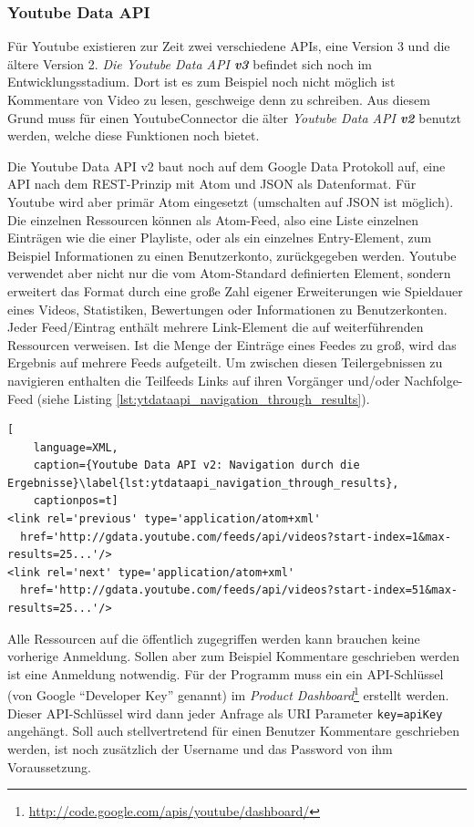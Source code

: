 \subsubsection{Youtube Data API} %
\label{ssub:youtube_data_api}

Für Youtube existieren zur Zeit zwei verschiedene APIs, eine Version 3 und die ältere Version 2. \emph{Die Youtube Data API \textbf{v3}} befindet sich noch im Entwicklungsstadium. Dort ist es zum Beispiel noch nicht möglich ist Kommentare von Video zu lesen, geschweige denn zu schreiben. Aus diesem Grund muss für einen YoutubeConnector die älter \emph{Youtube Data API \textbf{v2}} benutzt werden, welche diese Funktionen noch bietet. 

Die Youtube Data API v2 baut noch auf dem Google Data Protokoll auf, eine API nach dem REST-Prinzip mit Atom und JSON als Datenformat. Für Youtube wird aber primär Atom eingesetzt (umschalten auf JSON ist möglich). Die einzelnen Ressourcen können als Atom-Feed, also eine Liste einzelnen Einträgen wie die einer Playliste, oder als ein einzelnes Entry-Element, zum Beispiel Informationen zu einen Benutzerkonto, zurückgegeben werden. Youtube verwendet aber nicht nur die vom Atom-Standard definierten Element, sondern erweitert das Format durch eine große Zahl eigener Erweiterungen wie Spieldauer eines Videos, Statistiken, Bewertungen oder Informationen zu Benutzerkonten. Jeder Feed/Eintrag enthält mehrere Link-Element die auf weiterführenden Ressourcen verweisen. Ist die Menge der Einträge eines Feedes zu groß, wird das Ergebnis auf mehrere Feeds aufgeteilt. Um zwischen diesen Teilergebnissen zu navigieren enthalten die Teilfeeds Links auf ihren Vorgänger und/oder Nachfolge-Feed (siehe Listing \ref{lst:ytdataapi_navigation_through_results}).

\begin{lstlisting}[
    language=XML,
    caption={Youtube Data API v2: Navigation durch die Ergebnisse}\label{lst:ytdataapi_navigation_through_results},
    captionpos=t]
<link rel='previous' type='application/atom+xml'
  href='http://gdata.youtube.com/feeds/api/videos?start-index=1&max-results=25...'/>
<link rel='next' type='application/atom+xml'
  href='http://gdata.youtube.com/feeds/api/videos?start-index=51&max-results=25...'/>
\end{lstlisting}

Alle Ressourcen auf die öffentlich zugegriffen werden kann brauchen keine vorherige Anmeldung. Sollen aber zum Beispiel Kommentare geschrieben werden ist eine Anmeldung notwendig. Für der Programm muss ein ein API-Schlüssel (von Google \enquote{Developer Key} genannt) im \emph{Product Dashboard}\footnote{\url{http://code.google.com/apis/youtube/dashboard/}} erstellt werden. Dieser API-Schlüssel wird dann jeder Anfrage als URI Parameter \texttt{key={apiKey}} angehängt. Soll auch stellvertretend für einen Benutzer Kommentare geschrieben werden, ist noch zusätzlich der Username und das Password von ihm Voraussetzung.

